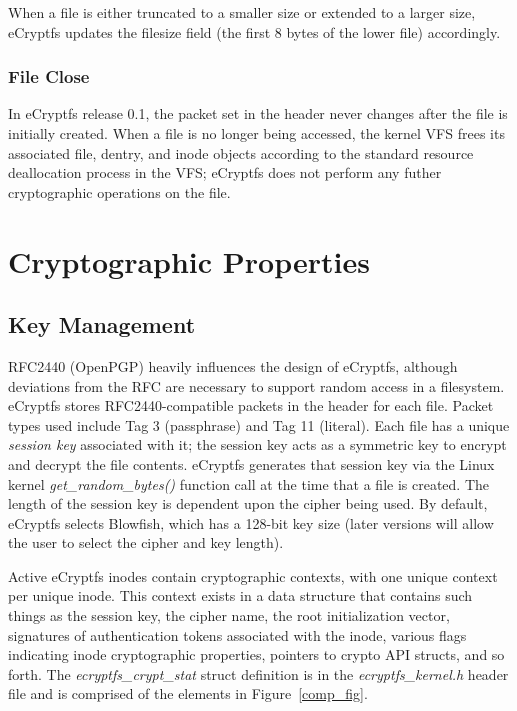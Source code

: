 \documentclass{article}
\begin{document}
When a file is either truncated to a smaller size or extended to a
larger size, eCryptfs updates the filesize field (the first 8 bytes of
the lower file) accordingly.

\subsubsection{File Close}

In eCryptfs release 0.1, the packet set in the header never changes
after the file is initially created. When a file is no longer being
accessed, the kernel VFS frees its associated file, dentry, and inode
objects according to the standard resource deallocation process in the
VFS; eCryptfs does not perform any futher cryptographic operations on
the file.

\section{Cryptographic Properties}

\subsection{Key Management}

\label{key_management}

RFC2440 (OpenPGP) heavily influences the design of eCryptfs, although
deviations from the RFC are necessary to support random access in a
filesystem. eCryptfs stores RFC2440-compatible packets in the header
for each file. Packet types used include Tag 3 (passphrase) and Tag 11
(literal). Each file has a unique \emph{session key} associated with
it; the session key acts as a symmetric key to encrypt and decrypt the
file contents. eCryptfs generates that session key via the Linux
kernel \emph{get\_random\_bytes()} function call at the time that a
file is created. The length of the session key is dependent upon the
cipher being used. By default, eCryptfs selects Blowfish, which has a
128-bit key size (later versions will allow the user to select the
cipher and key length).

Active eCryptfs inodes contain cryptographic contexts, with one unique
context per unique inode. This context exists in a data structure that
contains such things as the session key, the cipher name, the root
initialization vector, signatures of authentication tokens associated
with the inode, various flags indicating inode cryptographic
properties, pointers to crypto API structs, and so forth. The
\emph{ecryptfs\_crypt\_stat} struct definition is in the
\emph{ecryptfs\_kernel.h} header file and is comprised of the elements
in Figure~\ref{comp_fig}.
\end{document}
